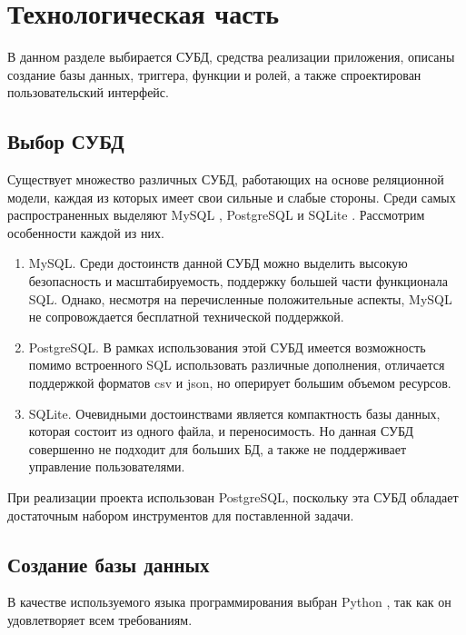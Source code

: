 \section{Технологическая часть}

В данном разделе выбирается СУБД, средства реализации приложения,
описаны создание базы данных, триггера, функции и ролей,
а также спроектирован пользовательский интерфейс.

\subsection{Выбор СУБД}

Существует множество различных СУБД, работающих на основе реляционной модели,
каждая из которых имеет свои сильные и слабые стороны.
Среди самых распространенных \cite{most_popular} выделяют MySQL \cite{mysql},
PostgreSQL \cite{postgresql} и SQLite \cite{sqlite}.
Рассмотрим особенности каждой из них.

\begin{enumerate}
    \item MySQL. Среди достоинств данной СУБД можно выделить высокую
          безопасность и масштабируемость,
          поддержку большей части функционала SQL. Однако, несмотря на перечисленные
          положительные аспекты,
          MySQL не сопровождается бесплатной технической поддержкой.
    \item PostgreSQL. В рамках использования этой СУБД имеется возможность
          помимо встроенного SQL использовать различные дополнения,
          отличается поддержкой форматов csv и json, но оперирует большим объемом
          ресурсов.
    \item SQLite. Очевидными достоинствами является компактность базы
          данных, которая состоит из одного файла,
          и переносимость.
          Но данная СУБД совершенно не подходит для больших БД, а также не
          поддерживает управление пользователями.
\end{enumerate}

При реализации проекта использован PostgreSQL,
поскольку эта СУБД обладает достаточным набором инструментов для поставленной
задачи.

\subsection{Создание базы данных}

В качестве используемого языка программирования выбран Python \cite{python}, так как он удовлетворяет всем требованиям.